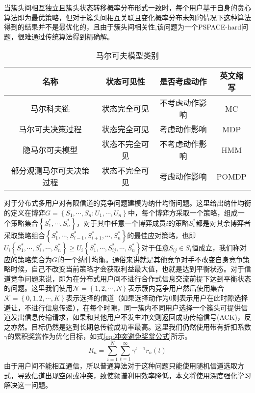 当簇头间相互独立且簇头状态转移概率分布形式一致时，每个用户基于自身的贪心算法即为最优策略\cite{Ahmad2009Optimality}，但对于簇头间相互关联且变化概率分布未知的情况下这种算法得到的结果并不是最优化的，且由于簇头间相关性,该问题为一个PSPACE-hard问题\cite{8303773}，很难通过传统算法得到精确解。
\begin{table}[htbp]
	\caption{马尔可夫模型类别}\label{tab:马尔可夫分类}
	\vspace{0.5em}\centering\wuhao
	\begin{tabular}{cccc}
		\toprule[1.5pt]
		名称 & 状态可见性 & 是否考虑动作 & 英文缩写 \\
		\midrule[1pt]
		马尔科夫链 & 状态完全可见 & 不考虑动作影响 & MC \\
		马尔可夫决策过程 & 状态完全可见 & 考虑动作影响 & MDP\\
		隐马尔可夫模型 & 状态不完全可见 & 不考虑动作影响 & HMM \\
		部分观测马尔可夫决策过程 & 状态不完全可见 & 考虑动作影响 & POMDP \\
		\bottomrule[1.5pt]
	\end{tabular}
\end{table}


对于分布式多用户对有限信道的竞争问题建模为纳什均衡问题。这里给出纳什均衡的定义在博弈$ G=\left \{ S_{1},\cdots,S_{n}:U_{1},\cdots,U_{n}\right \}  $中，每个博弈方采取一个策略，组成一个策略集合$\left\{S_{1}^{*},\cdots,S_{n}^{*}\right\}$，对于其中任意一个博弈成员$i$的策略$S_{i}^{*}$都是对其余博弈者采取策略组合$\left\{S_{1}^{*},\cdots,S_{i-1}^{*},S_{i+1}^{*},\cdots,S_{n}^{*}\right\}$的最佳应对策略，也即$U_{i}\left \{ S_{1}^{*}, \cdots ,S_{i}^{*},\cdots,S_{n}^{*} \right \}\geqslant U_{i}\left \{ S_{1}^{*},\cdots ,S_{ij}^{*},\cdots,S_{n}^{*} \right \}$对于任意$S_{ij}\in S_{i}$恒成立，我们称对应的策略集合为$G$的一个纳什均衡。通俗来讲就是其他竞争对手不改变自身竞争策略时候，自己不改变当前策略才会获取利益最大值，也就是达到平衡状态。对于信道竞争问题来说，即为在分布式用户间不进行合作式信息交流前提下达到平衡状态的问题。这里我们使用$\mathcal{N}=\left \{ 1,2,\cdots,N \right \}$表示簇内竞争用户然后使用集合$\mathcal{K}=\left \{0,1,2,\cdots,K \right \}$表示选择的信道（如果选择动作为0则表示用户在此时隙选择避让，不进行信息传递），在每个时隙，同一簇内不同用户选择一个簇头可提供信道发出信息传输请求，如果和其他用户不发生冲突则返回成功传输信号(ACK)，反之亦然。目标仍然是达到长期总传输成功率最高。这里我们仍然使用带有折扣系数$\gamma$的累积奖赏作为优化目标，如式\ref{eq:冲突避免奖赏公式}所示。
\begin{equation}\label{eq:冲突避免奖赏公式}
R_{n}=\sum_{i=1}^{N}\sum_{t=1}^{\infty }\gamma ^{t-1}r_{n}\left ( t \right )
\end{equation}
由于用户间不能相互通信，所以普通算法对于这种问题只能使用随机信道选取方式，导致信道出现空闲或冲突，致使频谱利用效率降低，本文将使用深度强化学习解决这一问题。

